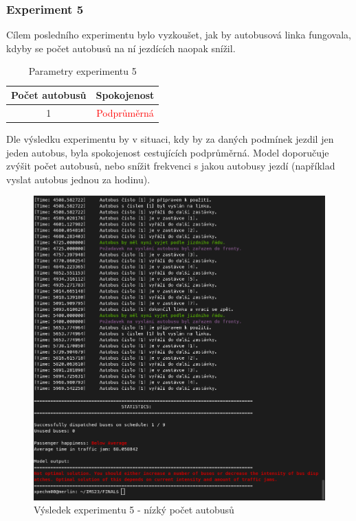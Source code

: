 \documentclass[a4paper]{article}
\begin{document}
            \newpage
            \subsubsection{Experiment 5}
            \label{subsubsec:experiment5}

                Cílem posledního experimentu bylo vyzkoušet, jak by autobusová linka fungovala, kdyby se počet autobusů na ní jezdících naopak snížil.
    
                \begin{table}[H]
                    \centering
                    \begin{tabular}{ | c | c |}
                        \hline
                        Počet autobusů & Spokojenost\\
                        \hline
                        \hline
                        1 & \textcolor{red}{Podprůměrná} \\
                        \hline
                    \end{tabular}
                    \caption{Parametry experimentu 5}
                    \label{tab:experiment5}
                \end{table}

            Dle výsledku experimentu by v situaci, kdy by za daných podmínek jezdil jen jeden autobus, byla spokojenost cestujících podprůměrná. Model doporučuje zvýšit počet autobusů, nebo snížit frekvenci s jakou autobusy jezdí (například vyslat autobus jednou za hodinu).
                
                \begin{figure}[H]
                \includegraphics[scale=0.37, keepaspectratio]{fig/ims_bus5.png}
                \caption{Výsledek experimentu 5 - nízký počet autobusů}
                \label{fig:experiment5}
            \end{figure}
\end{document}
